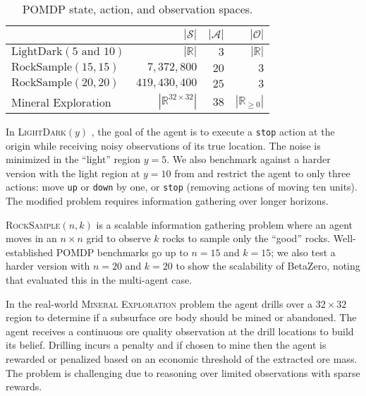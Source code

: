 \begin{table}[ht]
    \centering
    \begin{threeparttable}
        \begin{small}
        \begin{tabular}{@{}lrrr@{}}
            \toprule
                                                   &  $|\mathcal{S}|$              &  $|\mathcal{A}|$  &  $|\mathcal{O}|$  \\
            \midrule
            $\text{LightDark}(5 \text{ and } 10)$  &  $|\mathbb{R}|$               &  $3$              &  $|\mathbb{R}|$  \\
            $\text{RockSample}(15,15)$             &  $7{,}372{,}800$              &  $20$             &  $3$  \\
            $\text{RockSample}(20,20)$             &  $419{,}430{,}400$            &  $25$             &  $3$  \\
            Mineral Exploration                    &  $|\mathbb{R}^{32\times32}|$  &  $38$             &  $|\mathbb{R}_{\ge 0}|$  \\
            \bottomrule
        \end{tabular}
        \end{small}
    \end{threeparttable}
    \caption{POMDP state, action, and observation spaces.}\label{tab:spaces}
\end{table}

In \textsc{LightDark$(y)$} \cite{platt2010belief}, the goal of the agent is to execute a \texttt{stop} action at the origin while receiving noisy observations of its true location.
The noise is minimized in the ``light'' region ${y=5}$.
We also benchmark against a harder version with the light region at ${y=10}$ from \citeauthor{sunberg2018online} and restrict the agent to only three actions: move \texttt{up} or \texttt{down} by one, or \texttt{stop} (removing actions of moving ten units).
The modified problem requires information gathering over longer horizons.
 
\textsc{RockSample$(n,k)$} \cite{smith2012heuristic} is a scalable information gathering problem where an agent moves in an $n \times n$ grid to observe $k$ rocks to sample only the ``good'' rocks.
Well-established POMDP benchmarks go up to $n=15$ and $k=15$; we also test a harder version with $n=20$ and $k=20$ to show the scalability of BetaZero, noting that \citeauthor{cai2021hyp} evaluated this in the multi-agent case.

In the real-world \textsc{Mineral Exploration} problem \cite{mern2023intelligent} the agent drills over a $32\times32$ region to determine if a subsurface ore body should be mined or abandoned. %
The agent receives a continuous ore quality observation at the drill locations to build its belief.
Drilling incurs a penalty and if chosen to mine then the agent is rewarded or penalized  based on an economic threshold of the extracted ore mass.
The problem is challenging due to reasoning over limited observations with sparse rewards.


